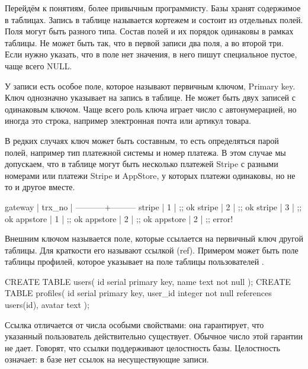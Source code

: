 Перейдём к понятиям, более привычным программисту. Базы хранят содержимое в таблицах. Запись в таблице называется кортежем и состоит из отдельных полей. Поля могут быть разного типа. Состав полей и их порядок одинаковы в рамках таблицы. Не может быть так, что в первой записи два поля, а во второй три. Если нужно указать, что в поле нет значения, в него пишут специальное пустое, чаще всего NULL.


У записи есть особое поле, которое называют первичным ключом, Primary key. Ключ однозначно указывает на запись в таблице. Не может быть двух записей с одинаковым ключом. Чаще всего роль ключа играет число с автонумерацией, но иногда это строка, например электронная почта или артикул товара.

В редких случаях ключ может быть составным, то есть определяться парой полей, например тип платежной системы и номер платежа. В этом случае мы допускаем, что в таблице могут быть несколько платежей Stripe с разными номерами или платежи Stripe и AppStore, у которых платежи одинаковы, но не то и другое вместе.

\begin{english}
  \begin{text}
 gateway   | trx_no |
-----------+---------
 stripe    | 1      | ;; ok
 stripe    | 2      | ;; ok
 stripe    | 3      | ;; ok
 appstore  | 1      | ;; ok
 appstore  | 2      | ;; ok
 appstore  | 2      | ;; error!
  \end{text}
\end{english}

Внешним ключом называется поле, которые ссылается на первичный ключ другой таблицы. Для краткости его называют ссылкой (ref). Примером может быть поле  таблицы профилей, которое указывает на поле  таблицы пользователей .


\begin{english}
  \begin{sql/lines}
CREATE TABLE users(
    id   serial primary key,
    name text not null
);
CREATE TABLE profiles(
    id      serial primary key,
    user_id integer not null references users(id),
    avatar  text
);
  \end{sql/lines}
\end{english}

Ссылка отличается от числа особыми свойствами: она гарантирует, что указанный пользователь действительно существует. Обычное число этой гарантии не дает. Говорят, что ссылки поддерживают целостность базы. Целостность означает: в базе нет ссылок на несуществующие записи.

